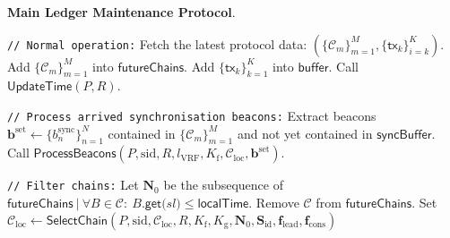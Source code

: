 \bigbreak
\bigbreak
\noindent
{}
\textbf{Main Ledger Maintenance Protocol}.\label{apndx:main-ledger-protocol}
\begin{protocol}
    \caption{$\textsf{LedgerMaintenance}(P, \text{sid}, \mathcal{C}_{\text{loc}}, R, K_{\text{f}}, K_{\text{g}}, \mathbf{S}_{\text{id}} = \{S_k^{\text{id}}\}_{k=1}^K,
    \mathbf{f}_{\text{lead}} =  \{f^{\text{lead}}_k\}_{k=1}^K,
    \mathbf{f}_{\text{cons}} = \{f^{\text{cons}}_k\}_{k=1}^K)$}
    \begin{algorithmic}[1]

        \noindent
        \lstinline|// Normal operation:|
        \State Fetch the latest protocol data: $(\{\mathcal{C}_m\}_{m=1}^M, \{\textsf{tx}_k\}_{i=k}^K)$.
        \State Add $\{\mathcal{C}_m\}_{m=1}^M$ into $\textsf{futureChains}$.
        \State Add $\{\textsf{tx}_k\}_{k=1}^K$ into $\textsf{buffer}$.
        \State Call $\textsf{UpdateTime}(P, R)$.

        \noindent
        \lstinline|// Process arrived synchronisation beacons:|
        \State Extract beacons $\mathbf{b}^{\text{set}} \leftarrow \{b^{\text{sync}}_n\}_{n=1}^N$ contained in $\{\mathcal{C}_m\}_{m=1}^M$ and not yet contained in $\textsf{syncBuffer}$.
        \State Call $\textsf{ProcessBeacons}(P, \text{sid}, R, l_{\text{VRF}}, K_{\text{f}}, \mathcal{C}_{\text{loc}}, \mathbf{b}^{\text{set}})$.

        \noindent
        \lstinline|// Filter chains:|
        \State Let $\mathbf{N}_0$ be the subsequence of $\textsf{futureChains}\ |\ \forall B \in \mathcal{C}:\ B{\textsf{.get(} sl \textsf{)}} \leq \textsf{localTime}$.
            \State Remove $\mathcal{C}$ from $\textsf{futureChains}$.
        \EndFor
        \State Set $\mathcal{C}_{\text{loc}} \leftarrow \textsf{SelectChain}(P, \text{sid}, \mathcal{C}_{\text{loc}}, R, K_{\text{f}}, K_{\text{g}}, \mathbf{N}_0,\mathbf{S}_{\text{id}},
        \mathbf{f}_{\text{lead}}, \mathbf{f}_{\text{cons}})$


\end{algorithmic}
\end{protocol}
